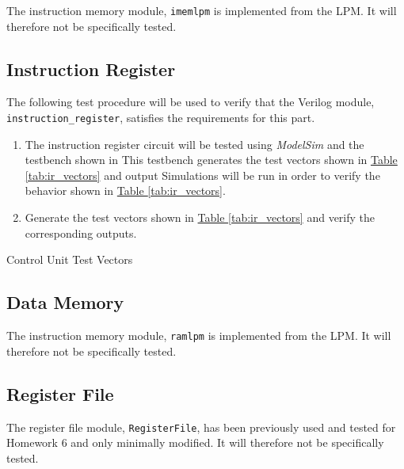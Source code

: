 The instruction memory module, \verb|imemlpm| is implemented from the LPM.
It will therefore not be specifically tested.


\subsection{Instruction Register} %
\label{sub:instruction_register}

The following test procedure will be used to verify that the Verilog module, \verb|instruction_register|, satisfies the requirements for this part.

\begin{enumerate}
    \item The instruction register circuit will be tested using \emph{ModelSim} and the testbench shown in %
    This testbench generates the test vectors shown in \hyperref[tab:ir_vectors]{Table \ref*{tab:ir_vectors}} and output %
    Simulations will be run in order to verify the behavior shown in \hyperref[tab:ir_vectors]{Table \ref*{tab:ir_vectors}}.
    \item Generate the test vectors shown in \hyperref[tab:ir_vectors]{Table \ref*{tab:ir_vectors}}
    and verify the corresponding outputs.
\end{enumerate}

\begin{table}[htbp]
    \centering
    \caption{Control Unit Test Vectors\label{tab:ir_vectors}}
\end{table}


\subsection{Data Memory} %
\label{sub:data_memory}

The instruction memory module, \verb|ramlpm| is implemented from the LPM.
It will therefore not be specifically tested.

\subsection{Register File} %
\label{sub:register_file}

The register file module, \verb|RegisterFile|, has been previously used and tested for Homework 6 and only minimally modified.
It will therefore not be specifically tested.

